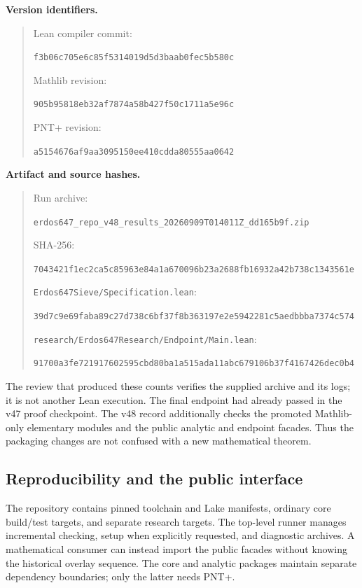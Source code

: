 \documentclass[11pt,a4paper]{article}
\theoremstyle{definition}
\theoremstyle{remark}
\numberwithin{equation}{section}
\begin{document}
\noindent\textbf{Version identifiers.}
\begin{quote}\small
Lean compiler commit:\par
\nolinkurl{f3b06c705e6c85f5314019d5d3baab0fec5b580c}\par\medskip
Mathlib revision:\par
\nolinkurl{905b95818eb32af7874a58b427f50c1711a5e96c}\par\medskip
PNT+ revision:\par
\nolinkurl{a5154676af9aa3095150ee410cdda80555aa0642}
\end{quote}

\noindent\textbf{Artifact and source hashes.}
\begin{quote}\small
Run archive:\par
\nolinkurl{erdos647_repo_v48_results_20260909T014011Z_dd165b9f.zip}\par
SHA-256:\par
\nolinkurl{7043421f1ec2ca5c85963e84a1a670096b23a2688fb16932a42b738c1343561e}\par\medskip
\nolinkurl{Erdos647Sieve/Specification.lean}:\par
\nolinkurl{39d7c9e69faba89c27d738c6bf37f8b363197e2e5942281c5aedbbba7374c574}\par\medskip
\nolinkurl{research/Erdos647Research/Endpoint/Main.lean}:\par
\nolinkurl{91700a3fe721917602595cbd80ba1a515ada11abc679106b37f4167426dec0b4}
\end{quote}
The review that produced these counts verifies the supplied archive and its
logs; it is not another Lean execution. The final endpoint had already passed
in the v47 proof checkpoint. The v48 record additionally checks the promoted
Mathlib-only elementary modules and the public analytic and endpoint facades.
Thus the packaging changes are not confused with a new mathematical theorem.

\subsection{Reproducibility and the public interface}
The repository contains pinned toolchain and Lake manifests, ordinary core
build/test targets, and separate research targets. The top-level runner manages
incremental checking, setup when explicitly requested, and diagnostic archives.
A mathematical consumer can instead import the public facades without knowing
the historical overlay sequence. The core and analytic packages maintain
separate dependency boundaries; only the latter needs PNT+.
\end{document}
